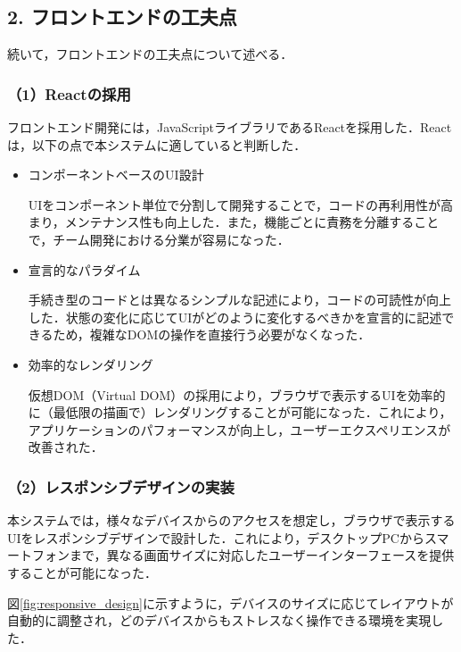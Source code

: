\subsection*{2. フロントエンドの工夫点}

続いて，フロントエンドの工夫点について述べる．

\subsubsection*{（1）Reactの採用}
フロントエンド開発には，JavaScriptライブラリであるReactを採用した．Reactは，以下の点で本システムに適していると判断した．

\begin{itemize}
	\item コンポーネントベースのUI設計
	
	UIをコンポーネント単位で分割して開発することで，コードの再利用性が高まり，メンテナンス性も向上した．また，機能ごとに責務を分離することで，チーム開発における分業が容易になった．
	
	\item 宣言的なパラダイム
	
	手続き型のコードとは異なるシンプルな記述により，コードの可読性が向上した．状態の変化に応じてUIがどのように変化するべきかを宣言的に記述できるため，複雑なDOMの操作を直接行う必要がなくなった．
	
	\item 効率的なレンダリング
	
	仮想DOM（Virtual DOM）の採用により，ブラウザで表示するUIを効率的に（最低限の描画で）レンダリングすることが可能になった．これにより，アプリケーションのパフォーマンスが向上し，ユーザーエクスペリエンスが改善された．
\end{itemize}

\subsubsection*{（2）レスポンシブデザインの実装}
本システムでは，様々なデバイスからのアクセスを想定し，ブラウザで表示するUIをレスポンシブデザインで設計した．これにより，デスクトップPCからスマートフォンまで，異なる画面サイズに対応したユーザーインターフェースを提供することが可能になった．

図\ref{fig:responsive_design}に示すように，デバイスのサイズに応じてレイアウトが自動的に調整され，どのデバイスからもストレスなく操作できる環境を実現した．


